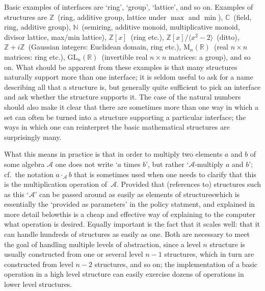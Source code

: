 \documentclass{mtmtcl}
\theoremstyle{plain}
\theoremstyle{remark}
\begin{document}
Basic examples of interfaces are `ring', `group', `lattice', and so 
on. Examples of structures are $\mathbb{Z}$~(ring, additive group, 
lattice under $\max$ and $\min$), $\mathbb{C}$~(field, ring, additive 
group), $\mathbb{N}$~(semiring, additive monoid, multiplicative 
monoid, divisor lattice, max/min lattice), $\mathbb{Z}[x]$~(ring etc.), 
$\mathbb{Z}[x]\big/ \langle x^2 - 2\rangle$~(ditto), $\mathbb{Z} + 
i\mathbb{Z}$~(Gaussian integers: Euclidean domain, ring etc.), 
$\mathrm{M}_n(\mathbb{R})$~(real $n \times n$ matrices: ring etc.), 
$\mathrm{GL}_n(\mathbb{R})$~(invertible real $n \times n$ matrices: a 
group), and so on. What should be apparent from these examples is 
that many structures naturally support more than one interface; it is 
seldom useful to ask for a name describing all that a structure is, 
but generally quite sufficient to pick an interface and ask whether 
the structure supports it. The case of the natural numbers should 
also make it clear that there are sometimes more than one way in which 
a set can often be turned into a structure supporting a particular 
interface; the ways in which one can reinterpret the basic 
mathematical structures are surprisingly many.

What this means in practice is that in order to multiply two 
elements $a$ and $b$ of some algebra $\mathcal{A}$ one does not 
write `$a$ times $b$', but rather `$\mathcal{A}$-multiply $a$ and 
$b$'; cf.~the notation \(a \cdot_{\mathcal{A}} b\) that is 
sometimes used when one needs to clarify that this is the 
multiplication operation of~$\mathcal{A}$. Provided that (references 
to) structures such as this `$\mathcal{A}$' can be passed around as 
easily as elements of structures\Ldash which is essentially the 
`provided as parameters' in the policy statment, and explained in 
more detail below\Rdash this is a cheap and effective way of 
explaining to the computer what operation is desired. Equally 
important is the fact that it scales well: that it can handle 
hundreds of structures as easily as one. Both are necessary to meet 
the goal of handling multiple levels of abstraction, since a level 
$n$ structure is usually constructed from one or several level $n-1$ 
structures, which in turn are constructed from level $n-2$ 
structures, and so on; the implementation of a basic operation in 
a high level structure can easily exercise dozens of operations in 
lower level structures.
\end{document}
